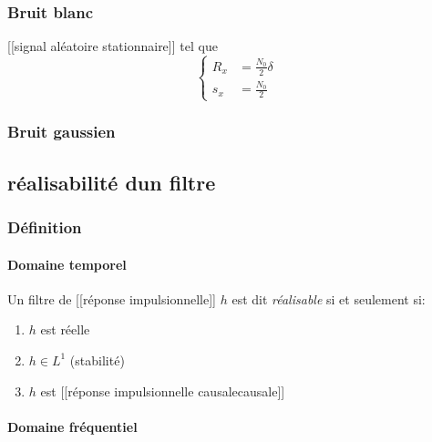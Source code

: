 \documentclass[
]{article}
\providecommand{\tightlist}{%
  \setlength{\itemsep}{0pt}\setlength{\parskip}{0pt}}
\begin{document}
\hypertarget{bruit-blanc}{%
\subsubsection{Bruit blanc}\label{bruit-blanc}}

{[}{[}signal aléatoire stationnaire{]}{]} tel que \[
\begin{cases}
R_x &= \frac{N_0}{2} \delta \\
s_x &= \frac{N_0}{2}
\end{cases}
\]

\hypertarget{bruit-gaussien}{%
\subsubsection{Bruit gaussien}\label{bruit-gaussien}}

\hypertarget{ruxe9alisabilituxe9-dun-filtre}{%
\subsection{réalisabilité d\textquotesingle un
filtre}\label{ruxe9alisabilituxe9-dun-filtre}}

\hypertarget{duxe9finition-4}{%
\subsubsection{Définition}\label{duxe9finition-4}}

\hypertarget{domaine-temporel}{%
\paragraph{Domaine temporel}\label{domaine-temporel}}

Un filtre de {[}{[}réponse impulsionnelle{]}{]} \(h\) est dit
\emph{réalisable} si et seulement si:

\begin{enumerate}
\def\labelenumi{\arabic{enumi}.}
\tightlist
\item
  \(h\) est réelle
\item
  \(h \in L^1\) (stabilité)
\item
  \(h\) est {[}{[}réponse impulsionnelle causale\textbar causale{]}{]}
\end{enumerate}

\hypertarget{domaine-fruxe9quentiel}{%
\paragraph{Domaine fréquentiel}\label{domaine-fruxe9quentiel}}
\end{document}
